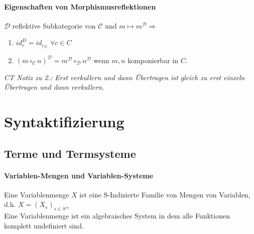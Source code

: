 \paragraph{ Eigenschaften von Morphismusreflektionen}  
$\mathcal{D}$ reflektive Subkategorie von $\mathcal{C}$ und $m \mapsto m^\mathcal{D} \Rightarrow$

\begin{enumerate}
\item $id_c^D = id_{c_\mathcal{D}}$ $\forall c \in C$
\item $(m \circ_\mathcal{C} n)^\mathcal{D} = m^\mathcal{D} \circ_\mathcal{D} n^\mathcal{D}$  wenn $m,n$ komponierbar in $C$.
\end{enumerate}
\emph{CT Notiz zu 2.: Erst verkullern und dann Übertragen ist gleich zu erst einzeln Übertragen und dann verkullern.}


\section{Syntaktifizierung}

\subsection{Terme und Termsysteme}

\paragraph{ Variablen-Mengen und Variablen-Systeme}  
Eine Variablenmenge $X$ ist eine S-Indizierte Familie von Mengen von Variablen, d.h. $X = (X_s)_{s \in S*}$ \\
Eine Variablenmenge ist ein algebraisches System in dem alle Funktionen komplett undefiniert sind.

